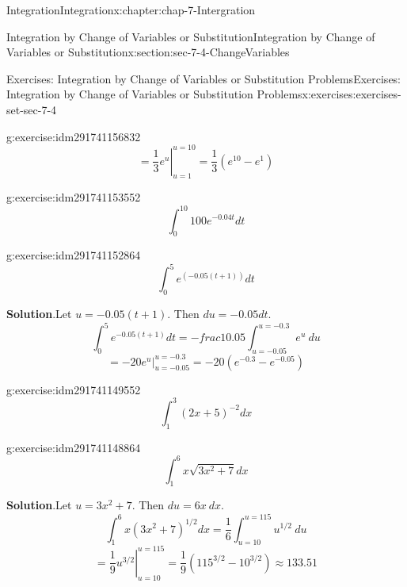 \documentclass[oneside,10pt,]{book}
\numberwithin{equation}{section}
\begin{document}
\begin{chapterptx}{Integration}{}{Integration}{}{}{x:chapter:chap-7-Intergration}
\begin{sectionptx}{Integration by Change of Variables or Substitution}{}{Integration by Change of Variables or Substitution}{}{}{x:section:sec-7-4-ChangeVariables}
\begin{exercises-subsection}{Exercises: Integration by Change of Variables or Substitution Problems}{}{Exercises: Integration by Change of Variables or Substitution Problems}{}{}{x:exercises:exercises-set-sec-7-4}
\begin{divisionexercise}{13}{}{}{g:exercise:idm291741156832}
\begin{equation*}
\end{equation*}
%
\begin{equation*}
=\left.\frac{1}{3}e^u\right|_{u=1}^{u=10}
=\frac{1}{3} (e^{10}-e^1)
\end{equation*}
\end{divisionexercise}%
\begin{divisionexercise}{14}{}{}{g:exercise:idm291741153552}%
%
\begin{equation*}
\int_0^10 100e^{-0.04t} dt 
\end{equation*}
\end{divisionexercise}%
\begin{divisionexercise}{15}{}{}{g:exercise:idm291741152864}%
%
\begin{equation*}
\int_0^5 e^{(-0.05(t+1))} dt 
\end{equation*}
\par\smallskip%
\noindent\textbf{Solution}.\hypertarget{g:solution:idm291741152176}{}\quad{}Let \(u=-0.05(t+1)\).  Then \(du=-0.05dt\).%
%
\begin{equation*}
\int_0^5 e^{-0.05(t+1)} dt=-frac{1}{0.05}\int_{u=-0.05}^{u=-0.3} e^u \ du
\end{equation*}
%
\begin{equation*}
=\left.-20e^u\right|_{u=-0.05}^{u=-0.3}
=-20 (e^{-0.3}-e^{-0.05})
\end{equation*}
\end{divisionexercise}%
\begin{divisionexercise}{16}{}{}{g:exercise:idm291741149552}%
%
\begin{equation*}
\int_1^3 (2x+5)^{-2} dx
\end{equation*}
\end{divisionexercise}%
\begin{divisionexercise}{17}{}{}{g:exercise:idm291741148864}%
%
\begin{equation*}
\int_1^6 x\sqrt{3x^2+7} dx 
\end{equation*}
\par\smallskip%
\noindent\textbf{Solution}.\hypertarget{g:solution:idm291741148176}{}\quad{}Let \(u=3x^2+7\).  Then \(du=6x\ dx\).%
%
\begin{equation*}
\int_1^6 x(3x^2+7)^{1/2} dx=\frac{1}{6}\int_{u=10}^{u=115} u^{1/2} \ du
\end{equation*}
%
\begin{equation*}
=\left.\frac{1}{9}u^{3/2}\right|_{u=10}^{u=115}
=\frac{1}{9} (115^{3/2}-10^{3/2})\approx 133.51
\end{equation*}
\end{divisionexercise}%

\end{exercises-subsection}
\end{sectionptx}
\end{chapterptx}
\end{document}
